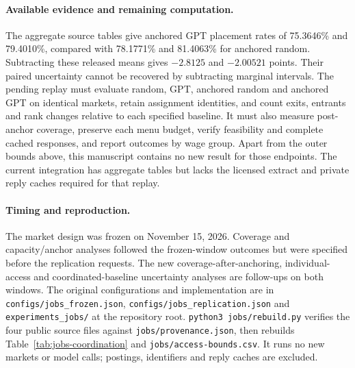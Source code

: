 \paragraph{Available evidence and remaining computation.}
The aggregate source tables give anchored GPT placement rates of 75.3646\%
and 79.4010\%, compared with 78.1771\% and 81.4063\% for anchored random.
Subtracting these released means gives $-2.8125$ and $-2.00521$ points.
Their paired uncertainty cannot be recovered by subtracting marginal
intervals. The pending replay must evaluate random, GPT, anchored random
and anchored GPT on identical markets, retain assignment identities, and
count exits, entrants and rank changes relative to each specified baseline.
It must also measure post-anchor coverage, preserve each menu budget, verify
feasibility and complete cached responses, and report outcomes by wage group.
Apart from the outer bounds above, this manuscript contains no new result for
those endpoints. The current
integration has aggregate tables but lacks the licensed extract and private
reply caches required for that replay.

\paragraph{Timing and reproduction.}
The market design was frozen on November 15, 2026. Coverage and capacity/anchor
analyses followed the frozen-window outcomes but were specified before the
replication requests. The new coverage-after-anchoring, individual-access
and coordinated-baseline uncertainty analyses are follow-ups on both windows.
The original configurations and implementation are in
\texttt{configs/jobs\_frozen.json}, \texttt{configs/jobs\_replication.json}
and \texttt{experiments\_jobs/} at the repository root.
\texttt{python3 jobs/rebuild.py} verifies the four public source files against
\texttt{jobs/provenance.json}, then rebuilds Table~\ref{tab:jobs-coordination}
and \texttt{jobs/access-bounds.csv}. It runs no new markets or model calls;
postings, identifiers and reply caches are excluded.
